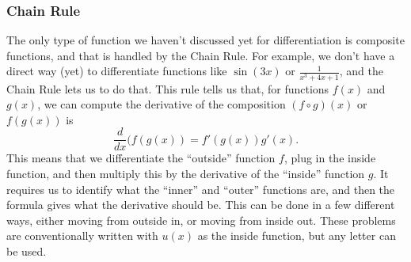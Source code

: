 \documentclass{ximera}
\begin{document}
\subsubsection{Chain Rule}

The only type of function we haven't discussed yet for differentiation is composite functions, and that is handled by the Chain Rule. For example, we don't have a direct way (yet) to differentiate functions like $\sin(3x)$ or $\frac{1}{x^3 + 4x + 1}$, and the Chain Rule lets us to do that. This rule tells us that, for functions $f(x)$ and $g(x)$, we can compute the derivative of the composition $(f \circ g)(x)$ or $f(g(x))$ is 
\[ 
    \frac{d}{dx}(f(g(x)) = f'(g(x))g'(x). 
\] 
This means that we differentiate the ``outside'' function $f$, plug in the inside function, and then multiply this by the derivative of the ``inside'' function $g$.  It requires us to identify what the ``inner'' and ``outer'' functions are, and then the formula gives what the derivative should be. This can be done in a few different ways, either moving from outside in, or moving from inside out. These problems are conventionally written with $u(x)$ as the inside function, but any letter can be used.
\end{document}
